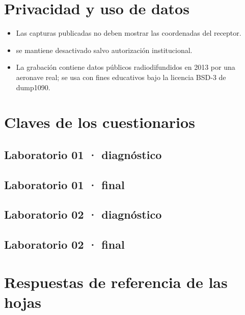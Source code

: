 \section{Privacidad y uso de datos}

\begin{itemize}
  \item Las capturas publicadas no deben mostrar las coordenadas del receptor.
  \item {} se mantiene desactivado salvo autorización institucional.
  \item La grabación contiene datos públicos radiodifundidos en 2013 por una aeronave real; se usa con fines educativos bajo la licencia BSD-3 de dump1090.
\end{itemize}

\section{Claves de los cuestionarios}
\label{sec:i-claves}

\subsection{Laboratorio 01 · diagnóstico}
\CuestionarioDiagnosticoW
\subsection{Laboratorio 01 · final}
\CuestionarioFinalW
\subsection{Laboratorio 02 · diagnóstico}
\CuestionarioDiagnosticoU
\subsection{Laboratorio 02 · final}
\CuestionarioFinalU

\section{Respuestas de referencia de las hojas}

